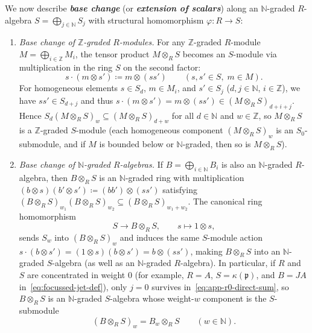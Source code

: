 \documentclass[a4paper, 12pt, reqno]{amsart}
\newcommand{\defterm}[1]{\textbf{\textit{#1}}\index{#1}}
\theoremstyle{remark}
\begin{document}
We now describe \defterm{base change} (or \defterm{extension of scalars}) along an $\mathbb{N}$-graded $R$-algebra $S = \bigoplus_{j \in \mathbb{N}} S_j$ with structural homomorphism $\varphi \colon R \to S$:
\begin{enumerate}
\item \emph{Base change of $\mathbb{Z}$-graded $R$-modules.}
  For any $\mathbb{Z}$-graded $R$-module $M = \bigoplus_{i \in \mathbb{Z}} M_i$,
  the tensor product $M \otimes_R S$ becomes an $S$-module via multiplication in the ring $S$ on the second factor:
  \begin{equation*}
    s \cdot (m \otimes s') \coloneq m \otimes (s s') \qquad (s, s' \in S,\; m \in M).
  \end{equation*}
  For homogeneous elements $s \in S_d$, $m \in M_i$, and $s' \in S_j$ ($d, j \in \mathbb{N}$, $i \in \mathbb{Z}$),
  we have $s s' \in S_{d + j}$ and thus $s \cdot (m \otimes s') = m \otimes (s s') \in (M \otimes_R S)_{d + i + j}$.
  Hence $S_d (M \otimes_R S)_w \subseteq (M \otimes_R S)_{d + w}$ for all $d \in \mathbb{N}$ and $w \in \mathbb{Z}$,
  so $M \otimes_R S$ is a $\mathbb{Z}$-graded $S$-module
  (each homogeneous component $(M \otimes_R S)_w$ is an $S_0$-submodule,
  and if $M$ is bounded below or $\mathbb{N}$-graded, then so is $M \otimes_R S$).
\item \emph{Base change of $\mathbb{N}$-graded $R$-algebras.}
  If $B = \bigoplus_{i \in \mathbb{N}} B_i$ is also an $\mathbb{N}$-graded $R$-algebra,
  then $B \otimes_R S$ is an $\mathbb{N}$-graded ring with multiplication $(b \otimes s)(b' \otimes s') \coloneq (bb') \otimes (ss')$ satisfying $(B \otimes_R S)_{w_1}(B \otimes_R S)_{w_2} \subseteq (B \otimes_R S)_{w_1 + w_2}$.
  The canonical ring homomorphism
  \begin{equation*}
    S \longrightarrow B \otimes_R S, \qquad s \longmapsto 1 \otimes s,
  \end{equation*}
  sends $S_w$ into $(B \otimes_R S)_w$ and induces the same $S$-module action $s \cdot (b \otimes s') = (1 \otimes s)(b \otimes s') = b \otimes (s s')$,
  making $B \otimes_R S$ into an $\mathbb{N}$-graded $S$-algebra (as well as an $\mathbb{N}$-graded $R$-algebra).
  In particular,
  if $R$ and $S$ are concentrated in weight $0$
  (for example, $R = A$, $S = \kappa(\mathfrak{p})$, and $B = J A$ in~\eqref{eq:focussed-jet-def}),
  only $j = 0$ survives in~\eqref{eq:app-r0-direct-sum},
  so $B \otimes_R S$ is an $\mathbb{N}$-graded $S$-algebra whose weight-$w$ component is the $S$-submodule
  \begin{equation}
    \label{eq:app-ring-tensor-weight0}
    (B \otimes_R S)_w = B_w \otimes_R S \qquad (w \in \mathbb{N}).
  \end{equation}
\end{enumerate}
\end{document}
